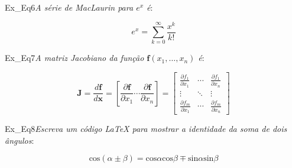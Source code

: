 \begin{texercise}{Ex_Eq6}\textit{A série de MacLaurin para \(e^x\) é}:\par\smallskip%
\begin{tcboutputlisting}
    \begin{center}
        \begin{equation*}
            e^x = \sum_{k=0}^{\infty} \frac{x^k}{k!}
        \end{equation*}
    \end{center}
\end{tcboutputlisting}
\tcbuselistingtext%
\end{texercise}

\begin{texercise}{Ex_Eq7}\textit{A matriz Jacobiano da função \(\mathbf{f}(x_1, \dots, x_n)\) é}:\par\smallskip%
\begin{tcboutputlisting}
    \begin{center}
        \begin{equation*}
            \mathbf{J}
            =
            \frac{d \mathbf{f}}{d \mathbf{x}}
            =
            \left[ \frac{\partial \mathbf{f}}{\partial x_1}
            \cdots \frac{\partial \mathbf{f}}{\partial x_n} \right]
            =
            \begin{bmatrix}
            \frac{\partial f_1}{\partial x_1} & \cdots &
            \frac{\partial f_1}{\partial x_n} \\
            \vdots & \ddots & \vdots \\
            \frac{\partial f_m}{\partial x_1} & \cdots &
            \frac{\partial f_m}{\partial x_n}
            \end{bmatrix}
        \end{equation*}
    \end{center}
\end{tcboutputlisting}
\tcbuselistingtext%
\end{texercise}

\begin{texercise}{Ex_Eq8}\textit{Escreva um código \LaTeX{} para mostrar a identidade da soma de dois ângulos}:\par\smallskip%
\begin{tcboutputlisting}
    \begin{center}
        \begin{equation*}
            \text{cos}(\alpha \pm \beta) = \text{cos}\alpha \text{cos}\beta \mp \text{sin}\alpha \text{sin}\beta
        \end{equation*}
    \end{center}
\end{tcboutputlisting}
\tcbuselistingtext%
\end{texercise}


